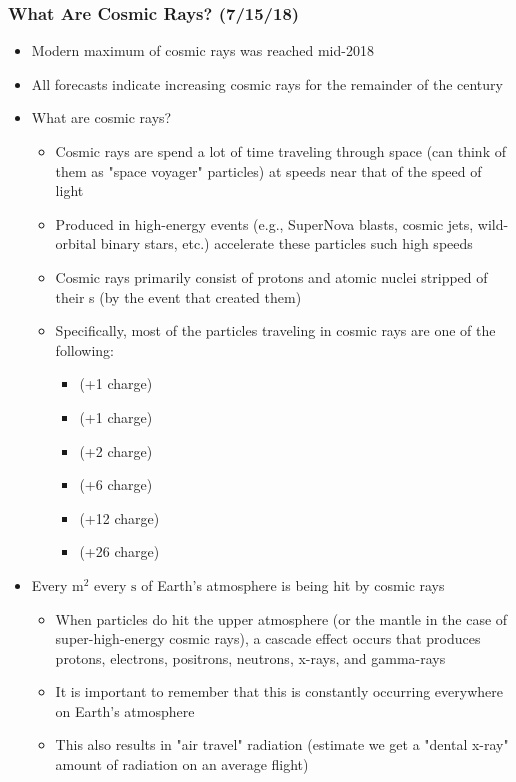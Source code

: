 \documentclass[a4paper]{article}
\begin{document}
	\subsubsection*{What Are Cosmic Rays? (7/15/18)}
	\begin{itemize}
		\item Modern maximum of cosmic rays was reached mid-2018
		\item All forecasts indicate increasing cosmic rays for the remainder of the century 
		\item What are cosmic rays?
			\begin{itemize}
				\item Cosmic rays are spend a lot of time traveling through space (can think of them as "space voyager" particles) at speeds near that of the speed of light 
				\item Produced in high-energy events (e.g., SuperNova blasts, cosmic jets, wild-orbital binary stars, etc.) accelerate these particles such high speeds 
				\item Cosmic rays primarily consist of protons and atomic nuclei stripped of their s (by the event that created them)
				\item Specifically, most of the particles traveling in cosmic rays are one of the following:
					\begin{itemize}
						\item {} (+1 charge)
						\item {} 	(+1 charge)
						\item {}	(+2 charge)
						\item {}	(+6 charge)
						\item {}	(+12 charge)
						\item {}	(+26 charge)
					\end{itemize} 
			\end{itemize}
		\item Every $\mathrm{m^2}$ every $\mathrm{s}$ of Earth's atmosphere is being hit by cosmic rays  
			\begin{itemize}
				\item When particles do hit the upper atmosphere (or the mantle in the case of super-high-energy cosmic rays), a cascade effect occurs that produces protons, electrons, positrons, neutrons, x-rays, and gamma-rays
				\item It is important to remember that this is constantly occurring everywhere on Earth's atmosphere
				\item This also results in "air travel" radiation (estimate we get a "dental x-ray" amount of radiation on an average flight) 

\end{itemize}
\end{itemize}
\end{document}
